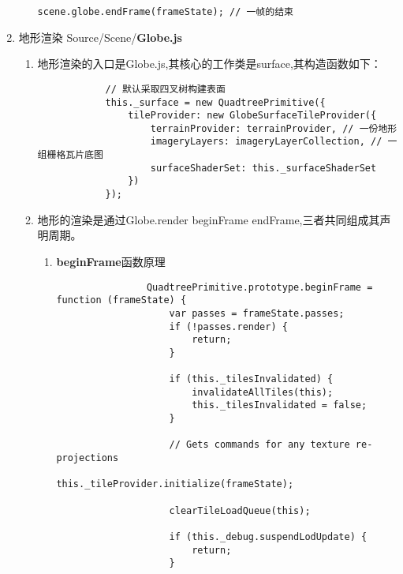 \begin{enumerate}
\begin{enumerate}
\begin{lstlisting}
scene.globe.endFrame(frameState); // 一帧的结束
\end{lstlisting}
	      \end{enumerate}
	\item 地形渲染 Source/Scene/\textbf{Globe.js}
	      \begin{enumerate}
		      \item 地形渲染的入口是Globe.js,其核心的工作类是surface,其构造函数如下：
		            \begin{lstlisting}
			// 默认采取四叉树构建表面	
			this._surface = new QuadtreePrimitive({ 
				tileProvider: new GlobeSurfaceTileProvider({
					terrainProvider: terrainProvider, // 一份地形
					imageryLayers: imageryLayerCollection, // 一组栅格瓦片底图
					surfaceShaderSet: this._surfaceShaderSet
				})
			});
		\end{lstlisting}
		      \item 地形的渲染是通过Globe.render beginFrame endFrame,三者共同组成其声明周期。
		            \begin{enumerate}
			            \item \textbf{beginFrame}函数原理
			                  \begin{lstlisting}
				QuadtreePrimitive.prototype.beginFrame = function (frameState) {
					var passes = frameState.passes;
					if (!passes.render) {
						return;
					}
				
					if (this._tilesInvalidated) {
						invalidateAllTiles(this);
						this._tilesInvalidated = false;
					}
				
					// Gets commands for any texture re-projections
					this._tileProvider.initialize(frameState);
				
					clearTileLoadQueue(this);
				
					if (this._debug.suspendLodUpdate) {
						return;
					}
				

\end{lstlisting}
\end{enumerate}
\end{enumerate}
\end{enumerate}
